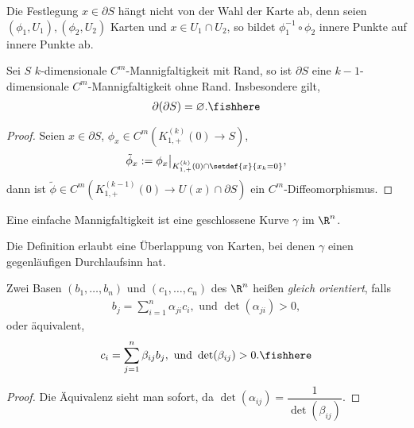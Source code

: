 \begin{bem}
\label{bem:4.4}
Die Festlegung $x\in\partial S$ hängt nicht von der Wahl der Karte ab, denn
seien $(\phi_1,U_1), (\phi_2,U_2)$ Karten und $x\in U_1\cap U_2$, so bildet
$\phi_1^{-1}\circ \phi_2$ innere Punkte auf innere Punkte ab.\maphere
\end{bem}

\begin{prop}
\label{prop:4.5}
Sei $S$ $k$-dimensionale $C^m$-Mannigfaltigkeit mit Rand, so ist $\partial S$
eine $k-1$-dimensionale $C^m$-Mannigfaltigkeit ohne Rand. Insbesondere gilt,
\begin{align*}
\partial(\partial S) = \varnothing.\fishhere
\end{align*}
\end{prop}
\begin{proof}
Seien $x\in\partial S$, $\phi_x\in C^m(K_{1,+}^{(k)}(0)\to S)$,
\begin{align*}
\tilde{\phi}_x := \phi_x\big|_{K_{1,+}^{(k)}(0)\cap \setdef{x}{x_k = 0}},
\end{align*}
dann ist $\tilde{\phi}\in C^m(K_{1,+}^{(k-1)}(0)\to U(x)\cap
\partial S)$ ein $C^m$-Diffeomorphismus.\qedhere
\end{proof}

\begin{bspn}
Eine einfache Mannigfaltigkeit ist eine geschlossene Kurve $\gamma$ im $\R^n$.

Die Definition erlaubt eine Überlappung von Karten, bei denen $\gamma$ einen
gegenläufigen Durchlaufsinn hat.\bsphere
\end{bspn}

\begin{defn}
\label{defn:4.6}
Zwei Basen $(b_1,\ldots,b_n)$ und $(c_1,\ldots,c_n)$ des $\R^n$ heißen
\emph{gleich orientiert}, falls
\begin{align*}
b_j = \sum\limits_{i=1}^n \alpha_{ji}c_i, \text{ und } \det(\alpha_{ji}) > 0,
\end{align*}
oder äquivalent,
\begin{align*}
c_i = \sum\limits_{j=1}^n \beta_{ij}b_j, \text{ und } \det(\beta_{ij}) >
0.\fishhere
\end{align*}
\end{defn}
\begin{proof}
Die Äquivalenz sieht man sofort, da $\det(\alpha_{ij}) =
\dfrac{1}{\det(\beta_{ij})}$.\qedhere
\end{proof}

